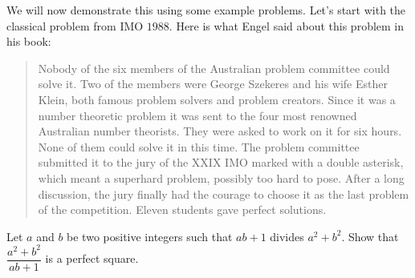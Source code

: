 We will now demonstrate this using some example problems. Let's start with the classical problem from IMO $1988$. Here is what Engel said about this problem in his book:
	\begin{quote}
		Nobody of the six members of the Australian problem committee could solve it. Two of the members were George Szekeres and his wife Esther Klein, both famous problem solvers and problem creators. Since it was a number theoretic problem it was sent to the four most renowned Australian number theorists. They were asked to work on it for six hours. None of them could solve it in this time. The problem committee submitted it to the jury of the XXIX IMO marked with a double asterisk, which meant a superhard problem, possibly too hard to pose. After a long discussion, the jury finally had the courage to choose it as the last problem of the competition. Eleven students gave perfect solutions.
	\end{quote}

\begin{problem}
	Let $ a$ and $ b$ be two positive integers such that $ab + 1$ divides $ a^{2} + b^{2}$. Show that $\dfrac{a^{2}+b^{2}}{ab+1}$ is a perfect square.
\end{problem}

